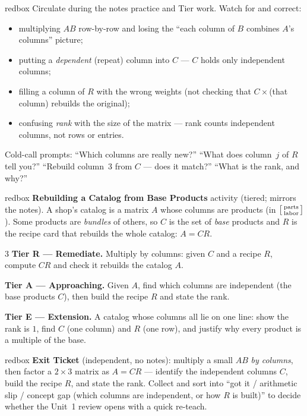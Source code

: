 \documentclass[10pt]{article}
\begin{document}
\begin{skillbox}{redbox}
Circulate during the notes practice and Tier work. Watch for and correct:
\begin{itemize}[leftmargin=1.2em, nosep]
  \item multiplying $AB$ row-by-row and losing the ``each column of $B$ combines $A$'s columns'' picture;
  \item putting a \emph{dependent} (repeat) column into $C$ --- $C$ holds only independent columns;
  \item filling a column of $R$ with the wrong weights (not checking that $C\times$(that column) rebuilds the original);
  \item confusing \emph{rank} with the size of the matrix --- rank counts independent columns, not rows or entries.
\end{itemize}
Cold-call prompts: ``Which columns are really new?'' ``What does column~$j$ of $R$ tell you?''
``Rebuild column~3 from $C$ --- does it match?'' ``What is the rank, and why?''
\end{skillbox}

\begin{skillbox}{redbox}
\textbf{Rebuilding a Catalog from Base Products} activity (tiered; mirrors the notes). A shop's
catalog is a matrix $A$ whose columns are products (in $\begin{bsmallmatrix} \text{parts} \\ \text{labor} \end{bsmallmatrix}$).
Some products are \emph{bundles} of others, so $C$ is the set of \emph{base} products and $R$ is
the recipe card that rebuilds the whole catalog: $A=CR$.
\begin{multicols}{3}
\textbf{Tier R --- Remediate.} Multiply by columns: given $C$ and a recipe $R$, compute $CR$ and
check it rebuilds the catalog $A$.

\columnbreak
\textbf{Tier A --- Approaching.} Given $A$, find which columns are independent (the base products
$C$), then build the recipe $R$ and state the rank.

\columnbreak
\textbf{Tier E --- Extension.} A catalog whose columns all lie on one line: show the rank is $1$,
find $C$ (one column) and $R$ (one row), and justify why every product is a multiple of the base.
\end{multicols}
\end{skillbox}

\begin{skillbox}{redbox}
\textbf{Exit Ticket} (independent, no notes): multiply a small $AB$ \emph{by columns}, then factor
a $2\times 3$ matrix as $A=CR$ --- identify the independent columns $C$, build the recipe $R$, and
state the rank. Collect and sort into ``got it / arithmetic slip / concept gap (which columns are
independent, or how $R$ is built)'' to decide whether the Unit~1 review opens with a quick re-teach.
\end{skillbox}
\end{document}
